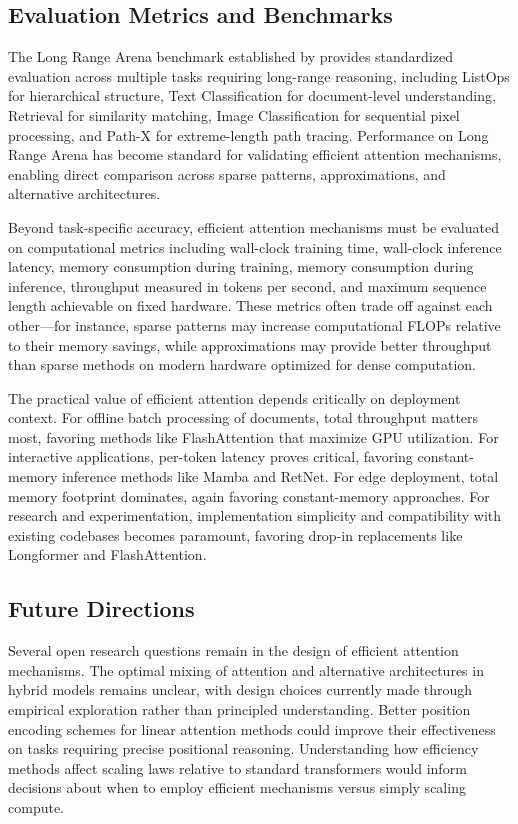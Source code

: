 \documentclass[11pt,letterpaper]{article}
\begin{document}
\subsection{Evaluation Metrics and Benchmarks}

The Long Range Arena benchmark established by \cite{tay2021long} provides standardized evaluation across multiple tasks requiring long-range reasoning, including ListOps for hierarchical structure, Text Classification for document-level understanding, Retrieval for similarity matching, Image Classification for sequential pixel processing, and Path-X for extreme-length path tracing. Performance on Long Range Arena has become standard for validating efficient attention mechanisms, enabling direct comparison across sparse patterns, approximations, and alternative architectures.

Beyond task-specific accuracy, efficient attention mechanisms must be evaluated on computational metrics including wall-clock training time, wall-clock inference latency, memory consumption during training, memory consumption during inference, throughput measured in tokens per second, and maximum sequence length achievable on fixed hardware. These metrics often trade off against each other—for instance, sparse patterns may increase computational FLOPs relative to their memory savings, while approximations may provide better throughput than sparse methods on modern hardware optimized for dense computation.

The practical value of efficient attention depends critically on deployment context. For offline batch processing of documents, total throughput matters most, favoring methods like FlashAttention that maximize GPU utilization. For interactive applications, per-token latency proves critical, favoring constant-memory inference methods like Mamba and RetNet. For edge deployment, total memory footprint dominates, again favoring constant-memory approaches. For research and experimentation, implementation simplicity and compatibility with existing codebases becomes paramount, favoring drop-in replacements like Longformer and FlashAttention.

\subsection{Future Directions}

Several open research questions remain in the design of efficient attention mechanisms. The optimal mixing of attention and alternative architectures in hybrid models remains unclear, with design choices currently made through empirical exploration rather than principled understanding. Better position encoding schemes for linear attention methods could improve their effectiveness on tasks requiring precise positional reasoning. Understanding how efficiency methods affect scaling laws relative to standard transformers would inform decisions about when to employ efficient mechanisms versus simply scaling compute.
\end{document}
